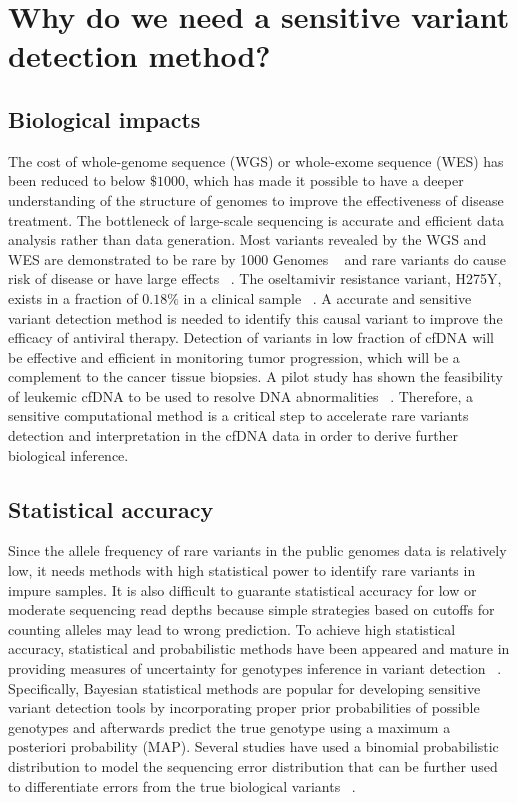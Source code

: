 \documentclass[11pt,reqno]{amsart}
\begin{document}
\section{Why do we need a sensitive variant detection method?}

\subsection{Biological impacts}

The cost of whole-genome sequence (WGS) or whole-exome sequence (WES) has been reduced to below $\$1000$, which has made it possible to have a deeper understanding of the structure of genomes to improve the effectiveness of disease treatment. 
The bottleneck of large-scale sequencing is accurate and efficient data analysis rather than data generation.
Most variants revealed by the WGS and WES are demonstrated to be rare by 1000 Genomes ~\citep{10002010map} and rare variants do cause risk of disease or have large effects ~\citep{kosmicki2016discovery}.
The oseltamivir resistance variant, H275Y, exists in a fraction of $0.18\%$ in a clinical sample ~\citep{Flaherty2012}.
A accurate and sensitive variant detection method is needed to identify this causal variant to improve the efficacy of antiviral therapy.
Detection of variants in low fraction of cfDNA will be effective and efficient in monitoring tumor progression, which will be a complement to the cancer tissue biopsies.
A pilot study has shown the feasibility of leukemic cfDNA to be used to resolve DNA abnormalities ~\citep{zhou2014pilot}.
Therefore, a sensitive computational method is a critical step to accelerate rare variants detection and interpretation in the cfDNA data in order to derive further biological inference.


\subsection{Statistical accuracy}

Since the allele frequency of rare variants in the public genomes data is relatively low, it needs methods with high statistical power to identify rare variants in impure samples. 
It is also difficult to guarante statistical accuracy for low or moderate sequencing read depths because simple strategies based on cutoffs for counting alleles may lead to wrong prediction.
To achieve high statistical accuracy, statistical and probabilistic methods have been appeared and mature in providing measures of uncertainty for genotypes inference in variant detection ~\citep{Nielsen2011}.  
Specifically, Bayesian statistical methods are popular for developing sensitive variant detection tools by incorporating proper prior probabilities of possible genotypes and afterwards predict the true genotype using a maximum a posteriori probability (MAP).
Several studies have used a binomial probabilistic distribution to model the sequencing error distribution that can be further used to differentiate errors from the true biological variants ~\citep{Flaherty2012, Shiraishi2013, gerstung2012reliable, Christoforides2013}.
\end{document}
